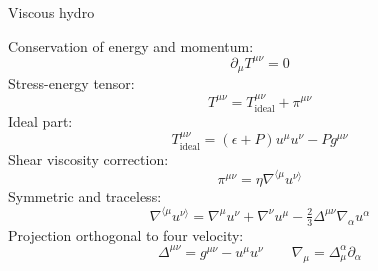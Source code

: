 \documentclass{beamer}
\begin{document}
\begin{frame}[label=hydroeq]{Viscous hydro}
  \small\vspace{2em}

  Conservation of energy and momentum:
  \begin{equation*}
    \partial_\mu T^{\mu\nu} = 0
  \end{equation*}
  Stress-energy tensor:
  \begin{equation*}
    T^{\mu\nu} = T^{\mu\nu}_\text{ideal} + \pi^{\mu\nu}
  \end{equation*}
  Ideal part: 
  \begin{equation*}
    T^{\mu\nu}_\text{ideal} = (\epsilon + P) u^\mu u^\nu - P g^{\mu\nu}
  \end{equation*}
  Shear viscosity correction:
  \begin{equation*}
    \pi^{\mu\nu} = \eta \nabla^{\langle\mu}u^{\nu\rangle}
  \end{equation*}
  Symmetric and traceless:
  \begin{equation*}
    \nabla^{\langle\mu}u^{\nu\rangle} = \nabla^\mu u^\nu + \nabla^\nu u^\mu - \tfrac{2}{3} \Delta^{\mu\nu} \nabla_\alpha u^\alpha
  \end{equation*}
  Projection orthogonal to four velocity:
  \begin{equation*}
    \Delta^{\mu\nu} = g^{\mu\nu} - u^\mu u^\nu \qquad
    \nabla_\mu = \Delta^\alpha_\mu \partial_\alpha
  \end{equation*}

\end{frame}


%


%
\end{document}
